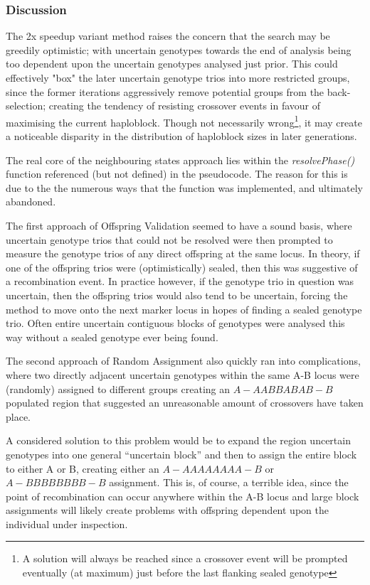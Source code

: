 \subsubsection{Discussion}

The 2x speedup variant method raises the concern that the search may be greedily optimistic; with uncertain genotypes towards the end of analysis being too dependent upon the uncertain genotypes analysed just prior. This could effectively "box" the later uncertain genotype trios into more restricted groups, since the former iterations aggressively remove potential groups from the back-selection; creating the tendency of resisting crossover events in favour of maximising the current haploblock. Though not necessarily wrong\footnote{A solution will always be reached since a crossover event will be prompted eventually (at maximum) just before the last flanking sealed genotype}, it may create a noticeable disparity in the distribution of haploblock sizes in later generations.

The real core of the neighbouring states approach lies within the \textit{resolvePhase()} function referenced (but not defined) in the pseudocode. The reason for this is due to the the numerous ways that the function was implemented, and ultimately abandoned.

The first approach of Offspring Validation seemed to have a sound basis, where uncertain genotype trios that could not be resolved were then prompted to measure the genotype trios of any direct offspring at the same locus. In theory, if one of the offspring trios were (optimistically) sealed, then this was suggestive of a recombination event. In practice however, if the genotype trio in question was uncertain, then the offspring trios would also tend to be uncertain, forcing the method to move onto the next marker locus in hopes of finding a sealed genotype trio. Often entire uncertain contiguous blocks of genotypes were analysed this way without a sealed genotype ever being found.

The second approach of Random Assignment also quickly ran into complications, where two directly adjacent uncertain genotypes within the same A-B locus were (randomly) assigned to different groups creating an $A-AABBABAB-B$ populated region that suggested an unreasonable amount of crossovers have taken place.

A considered solution to this problem would be to expand the region uncertain genotypes into one general “uncertain block” and then to assign the entire block to either A or B, creating either an $A-AAAAAAAA-B$ or $A-BBBBBBBB-B$ assignment. This is, of course, a terrible idea, since the point of recombination can occur anywhere within the A-B locus and large block assignments will likely create problems with offspring dependent upon the individual under inspection.

